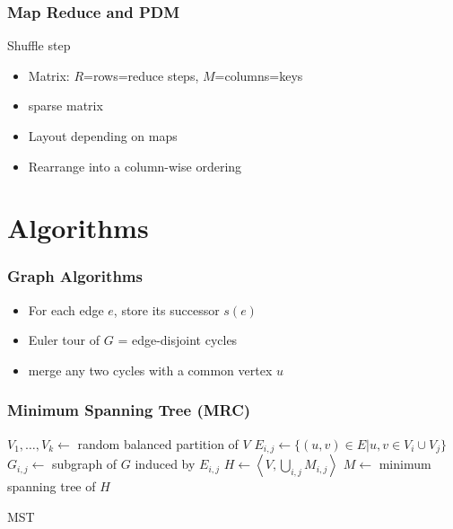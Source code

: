 \documentclass[12pt,aspectratio=169]{beamer}
\DeclareMathOperator{\poly}{\text{poly}}
\DeclareMathOperator{\polylog}{\text{polylog}}
\begin{document}



\begin{frame}\frametitle{Map Reduce and PDM}
  \begin{block}{Shuffle step}
  \begin{itemize}
  \item
    Matrix: $R$=rows=reduce steps, $M$=columns=keys
  \item
    sparse matrix
  \item
    Layout depending on maps
  \item
    Rearrange into a column-wise ordering
  \end{itemize}
\end{block}
\end{frame}



\section{Algorithms}



\begin{frame}\frametitle{Graph Algorithms}
  \begin{itemize}
  \item
    For each edge $e$, store its successor $s(e)$
  \item
    Euler tour of $G$ = edge-disjoint cycles
  \item
    merge any two cycles with a common vertex $u$
  \end{itemize}
\end{frame}

\begin{frame}\frametitle{Minimum Spanning Tree (MRC)}
  \begin{algorithm}[H]

    $V_{1}, \ldots, V_{k} \gets $ random balanced partition of $V$\;
    $E_{i,j} \gets \{(u, v) \in E | u, v \in V_{i} \cup V_{j} \}$\;
    $G_{i,j} \gets $ subgraph of $G$ induced by $E_{i,j}$\;
    $H \gets \left\langle V, \bigcup_{i,j} M_{i,j}\right\rangle $\;
    $M \gets$ minimum spanning tree of $H$\;
    \label{alg:MRC-MST}
    \caption{MST}
  \end{algorithm}
\end{frame}
\end{document}
